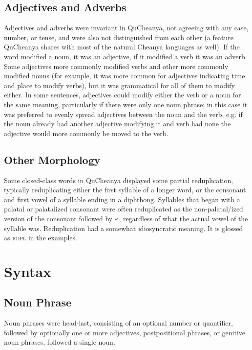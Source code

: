 \documentclass{article}
\begin{document}
\subsection{Adjectives and Adverbs}

Adjectives and adverbs were invariant in QuCheanya, not agreeing with any case, number, or tense, and were also not distinguished from each other (a feature QuCheanya shares with most of the natural Cheanya languages as well).  If the word modified a noun, it was an adjective, if it modified a verb it was an adverb.  Some adjectives more commonly modified verbs and other more commonly modified nouns (for example, it was more common for adjectives indicating time and place to modify verbs), but it was grammatical for all of them to modify either.  In some sentences, adjectives could modify either the verb or a noun for the same meaning, particularly if there were only one noun phrase; in this case it was preferred to evenly spread adjectives between the noun and the verb, e.g. if the noun already had another adjective modifying it and verb had none the adjective would more commonly be moved to the verb.

\subsection{Other Morphology}

Some closed-class words in QuCheanya displayed some partial reduplication, typically reduplicating either the first syllable of a longer word, or the consonant and first vowel of a syllable ending in a diphthong.  Syllables that began with a palatal or palatalized consonant were often reduplicated as the non-palatal/ized version of the consonant followed by -i, regardless of what the actual vowel of the syllable was.  Reduplication had a somewhat idiosyncratic meaning.  It is glossed as \textsc{rdpl} in the examples.

\section{Syntax}
\subsection{Noun Phrase}

Noun phrases were head-last, consisting of an optional number or quantifier, followed by optionally one or more adjectives, postpositional phrases, or genitive noun phrases, followed a single noun.  
\end{document}
